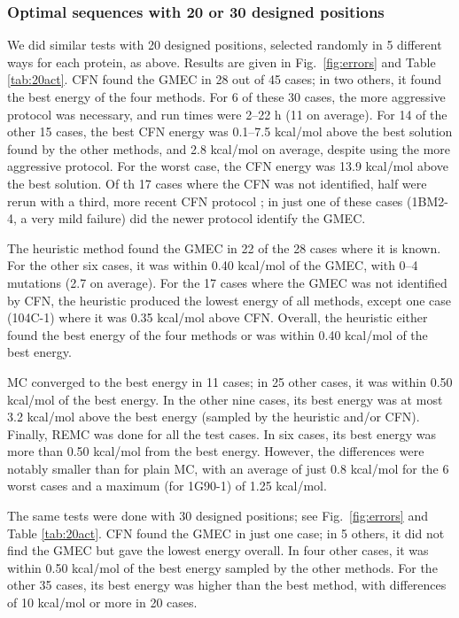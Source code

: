 \subsubsection{Optimal sequences with 20 or 30 designed positions}
We did similar tests with 20 designed positions, selected randomly in 5 different ways for each protein, as above.
Results are given in Fig.\ \ref{fig:errors} and Table \ref{tab:20act}. CFN found the GMEC in 28 out of 45 cases;
in two others, it found the best energy of the four methods. For 6 of these 30 cases, the more aggressive protocol was necessary, and run times were 2--22 h (11 on average). For 14 of the other 15 cases, the best CFN energy was 0.1--7.5 kcal/mol above the best solution found by the other methods, and 2.8 kcal/mol on average, despite using the more aggressive protocol. For the worst case, the CFN energy was 13.9 kcal/mol above the best solution. Of th 17 cases where the CFN was not identified, half were rerun with a third, more recent CFN protocol \cite{Simoncini15}; in just one of these cases (1BM2-4, a very mild failure) did the newer protocol identify the GMEC.

The heuristic method found the GMEC in 22 of the 28 cases where it is known. For the other six cases, it was within 0.40 kcal/mol of the GMEC, with 0--4 mutations (2.7 on average). For the 17 cases where the GMEC was not identified by CFN, the heuristic produced the lowest energy of all methods, except one case (104C-1) where it was 0.35 kcal/mol above CFN.
Overall, the heuristic either found the best energy of the four methods or was within 0.40 kcal/mol of the best energy.

MC converged to the best energy in 11 cases; in 25 other cases, it was within 0.50 kcal/mol of the best energy. In the other nine cases, its best energy was at most 3.2 kcal/mol above the best energy (sampled by the heuristic and/or CFN).
Finally, REMC was done for all the test cases. In six cases, its best energy was more than 0.50 kcal/mol from the best energy. However, the differences were notably smaller than for plain MC, with an average of just 0.8 kcal/mol for the 6 worst cases and a maximum (for 1G90-1) of 1.25 kcal/mol.

The same tests were done with 30 designed positions; see Fig.\ \ref{fig:errors} and Table \ref{tab:20act}. CFN found the GMEC in just one case; in 5 others, it did not find the GMEC but gave the lowest energy overall. In four other cases, it was within 0.50 kcal/mol of the best energy sampled by the other methods. For the other 35 cases, its best energy was higher than the best method, with differences of 10 kcal/mol or more in 20 cases.


